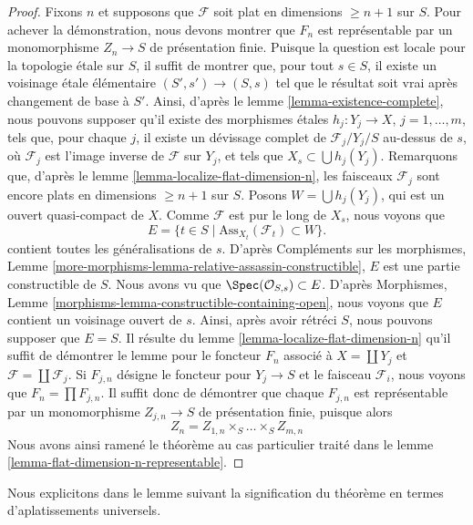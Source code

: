 \begin{proof}
\medskip\noindent
Fixons $n$ et supposons que $\mathcal{F}$ soit plat en dimensions $\geq n + 1$
sur $S$. Pour achever la démonstration, nous devons montrer que $F_n$ est représentable
par un monomorphisme $Z_n \to S$ de présentation finie.
Puisque la question est locale pour la topologie \'etale sur $S$, il suffit de
montrer que, pour tout $s \in S$, il existe un voisinage \'etale élémentaire
$(S', s') \to (S, s)$ tel que le résultat soit vrai après changement de base à $S'$.
Ainsi, d'après le
lemme \ref{lemma-existence-complete},
nous pouvons supposer qu'il existe des morphismes \'etales $h_j : Y_j \to X$,
$j = 1, \ldots, m$, tels que, pour chaque $j$, il existe un d\'evissage complet
de $\mathcal{F}_j/Y_j/S$ au-dessus de $s$,
où $\mathcal{F}_j$ est l'image inverse de $\mathcal{F}$ sur $Y_j$,
et tels que $X_s \subset \bigcup h_j(Y_j)$. Remarquons que, d'après le
lemme \ref{lemma-localize-flat-dimension-n},
les faisceaux $\mathcal{F}_j$ sont encore plats
en dimensions $\geq n + 1$ sur $S$.
Posons $W = \bigcup h_j(Y_j)$, qui est un ouvert quasi-compact de $X$.
Comme $\mathcal{F}$ est pur le long de $X_s$, nous voyons que
$$
E = \{t \in S \mid \text{Ass}_{X_t}(\mathcal{F}_t) \subset W \}.
$$
contient toutes les généralisations de $s$. D'après
Compléments sur les morphismes,
Lemme \ref{more-morphisms-lemma-relative-assassin-constructible},
$E$ est une partie constructible de $S$. Nous avons vu que
$\Spec(\mathcal{O}_{S, s}) \subset E$. D'après
Morphismes, Lemme \ref{morphisms-lemma-constructible-containing-open},
nous voyons que $E$ contient un voisinage ouvert de $s$.
Ainsi, après avoir rétréci $S$, nous pouvons supposer que $E = S$.
Il résulte du
lemme \ref{lemma-localize-flat-dimension-n}
qu'il suffit de démontrer le lemme pour le foncteur $F_n$ associé à
$X = \coprod Y_j$ et $\mathcal{F} = \coprod \mathcal{F}_j$.
Si $F_{j, n}$ désigne le foncteur pour $Y_j \to S$ et le faisceau
$\mathcal{F}_i$, nous voyons que $F_n = \prod F_{j, n}$. Il suffit donc
de démontrer que chaque $F_{j, n}$ est représentable par un monomorphisme
$Z_{j, n} \to S$ de présentation finie, puisque alors
$$
Z_n = Z_{1, n} \times_S \ldots \times_S Z_{m, n}
$$
Nous avons ainsi ramené le théorème au cas particulier traité dans le
lemme \ref{lemma-flat-dimension-n-representable}.
\end{proof}

\noindent
Nous explicitons dans le lemme suivant la signification du théorème en termes
d'aplatissements universels.

